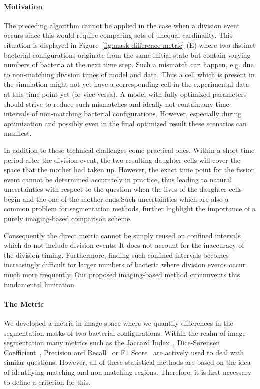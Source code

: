 \documentclass[10pt,letterpaper]{article}
\begin{document}
\paragraph{Motivation}
The preceding algorithm cannot be applied in the case when a division event occurs since this would
require comparing sets of unequal cardinality.
This situation is displayed in Figure~\ref{fig:mask-difference-metric} (E) where two distinct
bacterial configurations originate from the same initial state but contain varying numbers of
bacteria at the next time step.
Such a mismatch can happen, e.g. due to non-matching division times of model and data.
Thus a cell which is present in the simulation might not yet have a corresponding cell in the
experimental data at this time point yet (or vice-versa).
A model with fully optimized parameters should strive to reduce such mismatches and ideally not
contain any time intervals of non-matching bacterial configurations.
However, especially during optimization and possibly even in the final optimized result these
scenarios can manifest.

In addition to these technical challenges come practical ones.
Within a short time period after the division event, the two resulting daughter cells will cover
the space that the mother had taken up.
However, the exact time point for the fission event cannot be determined accurately in practice,
thus leading to natural uncertainties with respect to the question when the lives of the daughter
cells begin and the one of the mother ends.Such uncertainties which are also a common problem for
segmentation methods, further highlight the importance of a purely imaging-based comparison scheme.

Consequently the direct metric cannot be simply reused on confined intervals which
do not include division events:
It does not account for the inaccuracy of the division timing.
Furthermore, finding such confined intervals becomes increasingly difficult for larger numbers of
bacteria where division events occur much more frequently.
Our proposed imaging-based method circumvents this fundamental limitation.

\paragraph{The Metric}
We developed a metric in image space where we quantify
differences in the segmentation masks of two bacterial configurations.
Within the realm of image segmentation many metrics such as the Jaccard Index~\cite{Murphy1996},
Dice-Sørensen Coefficient~\cite{Dice1945}, Precision and Recall~\cite{Takaya2015} or F1
Score~\cite{Taha2015} are actively used to deal with similar questions.
However, all of these statistical methods are based on the idea of identifying matching and
non-matching regions.
Therefore, it is first necessary to define a criterion for this.
\end{document}

